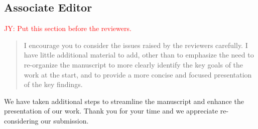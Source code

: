 \documentclass[12pt]{article}
\newcommand{\jy}[1]{\textcolor{red}{JY: #1}}
\newenvironment{comment}%
{\begin{quotation}\noindent\small\it\color{darkblue}\ignorespaces%
}{\end{quotation}}
\begin{document}
\subsection*{Associate Editor}
\jy{Put this section before the reviewers.}

\begin{comment}
I encourage you to consider the issues raised by the reviewers carefully. I have
little additional material to add, other than to emphasize the need to
re-organize the manuscript to more clearly identify the key goals of the work at
the start, and to provide a more concise and focused presentation of the key
findings.
\end{comment}


We have taken additional steps to streamline the manuscript and enhance the
presentation of our work. Thank you for your time and we appreciate re-considering
our submission.


%
%
\end{document}
